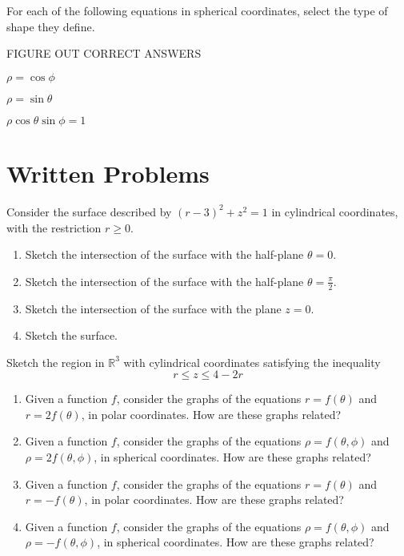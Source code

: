 \documentclass{ximera}
\begin{document}
\begin{problem}
For each of the following equations in spherical coordinates, select the type of shape they define.

FIGURE OUT CORRECT ANSWERS

$\rho = \cos\phi$
\begin{multipleChoice}
\end{multipleChoice}

$\rho = \sin\theta$
\begin{multipleChoice}
\end{multipleChoice}

$\rho\cos\theta\sin\phi = 1$
\begin{multipleChoice}
\end{multipleChoice}
\end{problem}

\section{Written Problems}
\begin{problem}
Consider the surface described by $(r-3)^2 +z^2 = 1$ in cylindrical coordinates, with the restriction $r\geq 0$.
\begin{enumerate}
\item Sketch the intersection of the surface with the half-plane $\theta = 0$.
\item Sketch the intersection of the surface with the half-plane $\theta = \frac{\pi}{2}$.
\item Sketch the intersection of the surface with the plane $z = 0$. 
\item Sketch the surface.
\end{enumerate}
\end{problem}

\begin{problem}
Sketch the region in $\mathbb{R}^3$ with cylindrical coordinates satisfying the inequality
\[
r\leq z \leq 4-2r
\]
\end{problem}

\begin{problem}
\begin{enumerate}
\item Given a function $f$, consider the graphs of the equations $r = f(\theta)$ and $r = 2f(\theta)$, in polar coordinates. How are these graphs related?
\item Given a function $f$, consider the graphs of the equations $\rho = f(\theta, \phi)$ and $\rho = 2f(\theta, \phi)$, in spherical coordinates. How are these graphs related?
\item Given a function $f$, consider the graphs of the equations $r = f(\theta)$ and $r = -f(\theta)$, in polar coordinates. How are these graphs related?
\item Given a function $f$, consider the graphs of the equations $\rho = f(\theta, \phi)$ and $\rho = -f(\theta, \phi)$, in spherical coordinates. How are these graphs related?
\end{enumerate}
\end{problem}
\end{document}
